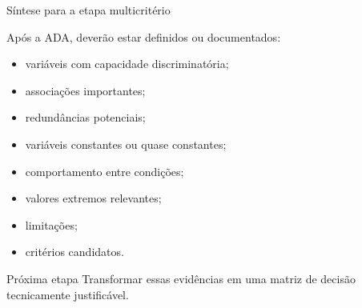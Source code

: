 
\begin{frame}{Síntese para a etapa multicritério}

    Após a ADA, deverão estar definidos ou documentados:

    \begin{itemize}
        \item variáveis com capacidade discriminatória;
        \item associações importantes;
        \item redundâncias potenciais;
        \item variáveis constantes ou quase constantes;
        \item comportamento entre condições;
        \item valores extremos relevantes;
        \item limitações;
        \item critérios candidatos.
    \end{itemize}

    \vspace{0.3cm}

    \begin{block}{Próxima etapa}
        Transformar essas evidências em uma matriz de decisão
        tecnicamente justificável.
    \end{block}

\end{frame}


%
%
%
%
%


%
%
%
%


%
%
%
%

